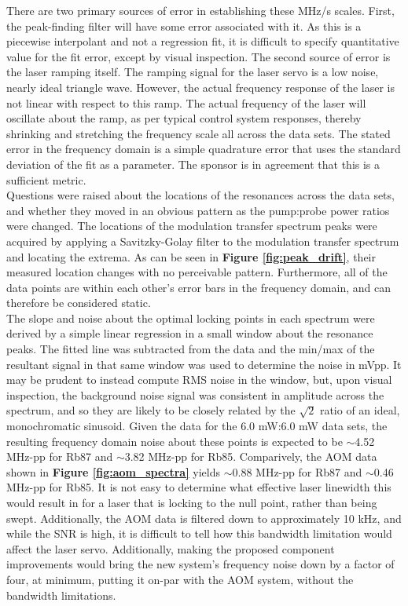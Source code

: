 There are two primary sources of error in establishing these MHz/s scales. First, the peak-finding filter will have some error associated with it. As this is a piecewise interpolant and not a regression fit, it is difficult to specify quantitative value for the fit error, except by visual inspection. The second source of error is the laser ramping itself. The ramping signal for the laser servo is a low noise, nearly ideal triangle wave. However, the actual frequency response of the laser is not linear with respect to this ramp. The actual frequency of the laser will oscillate about the ramp, as per typical control system responses, thereby shrinking and stretching the frequency scale all across the data sets. The stated error in the frequency domain is a simple quadrature error that uses the standard deviation of the fit as a parameter. The sponsor is in agreement that this is a sufficient metric. \\

Questions were raised about the locations of the resonances across the data sets, and whether they moved in an obvious pattern as the pump:probe power ratios were changed. The locations of the modulation transfer spectrum peaks were acquired by applying a Savitzky-Golay filter to the modulation transfer spectrum and locating the extrema. As can be seen in \textbf{Figure \ref{fig:peak_drift}}, their measured location changes with no perceivable pattern. Furthermore, all of the data points are within each other's error bars in the frequency domain, and can therefore be considered static. \\

The slope and noise about the optimal locking points in each spectrum were derived by a simple linear regression in a small window about the resonance peaks. The fitted line was subtracted from the data and the min/max of the resultant signal in that same window was used to determine the noise in mVpp. It may be prudent to instead compute RMS noise in the window, but, upon visual inspection, the background noise signal was consistent in amplitude across the spectrum, and so they are likely to be closely related by the $\sqrt{2}$ ratio of an ideal, monochromatic sinusoid. Given the data for the 6.0 mW:6.0 mW data sets, the resulting frequency domain noise about these points is expected to be $\sim$4.52 MHz-pp for Rb87 and $\sim$3.82 MHz-pp for Rb85. Comparively, the AOM data shown in \textbf{Figure \ref{fig:aom_spectra}} yields $\sim$0.88 MHz-pp for Rb87 and $\sim$0.46 MHz-pp for Rb85. It is not easy to determine what effective laser linewidth this would result in for a laser that is locking to the null point, rather than being swept. Additionally, the AOM data is filtered down to approximately 10 kHz, and while the SNR is high, it is difficult to tell how this bandwidth limitation would affect the laser servo. Additionally, making the proposed component improvements would bring the new system's frequency noise down by a factor of four, at minimum, putting it on-par with the AOM system, without the bandwidth limitations.

